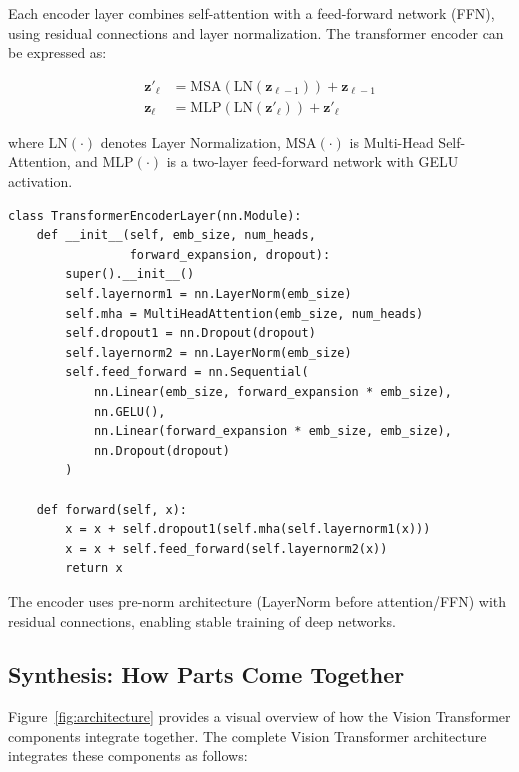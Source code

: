 \documentclass{article}
\begin{document}
Each encoder layer combines self-attention with a feed-forward network (FFN), using residual connections and layer normalization. The transformer encoder can be expressed as:

\begin{align}
\mathbf{z}'_\ell &= \text{MSA}(\text{LN}(\mathbf{z}_{\ell-1})) + \mathbf{z}_{\ell-1} \label{eq:encoder1} \\
\mathbf{z}_\ell &= \text{MLP}(\text{LN}(\mathbf{z}'_\ell)) + \mathbf{z}'_\ell \label{eq:encoder2}
\end{align}

where $\text{LN}(\cdot)$ denotes Layer Normalization, $\text{MSA}(\cdot)$ is Multi-Head Self-Attention, and $\text{MLP}(\cdot)$ is a two-layer feed-forward network with GELU activation.

\begin{lstlisting}[caption={Transformer Encoder Layer}]
class TransformerEncoderLayer(nn.Module):
    def __init__(self, emb_size, num_heads, 
                 forward_expansion, dropout):
        super().__init__()
        self.layernorm1 = nn.LayerNorm(emb_size)
        self.mha = MultiHeadAttention(emb_size, num_heads)
        self.dropout1 = nn.Dropout(dropout)
        self.layernorm2 = nn.LayerNorm(emb_size)
        self.feed_forward = nn.Sequential(
            nn.Linear(emb_size, forward_expansion * emb_size),
            nn.GELU(),
            nn.Linear(forward_expansion * emb_size, emb_size),
            nn.Dropout(dropout)
        )
    
    def forward(self, x):
        x = x + self.dropout1(self.mha(self.layernorm1(x)))
        x = x + self.feed_forward(self.layernorm2(x))
        return x
\end{lstlisting}

The encoder uses pre-norm architecture (LayerNorm before attention/FFN) with residual connections, enabling stable training of deep networks.

\subsection{Synthesis: How Parts Come Together}

Figure~\ref{fig:architecture} provides a visual overview of how the Vision Transformer components integrate together. The complete Vision Transformer architecture integrates these components as follows:
\end{document}
